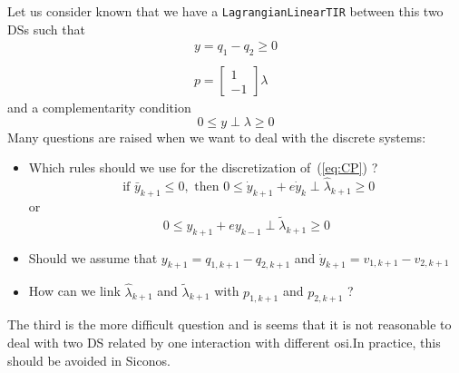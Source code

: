 Let us consider known that we have a {\tt LagrangianLinearTIR} between this two DSs such that
\begin{equation}
  \label{eq:LTIR-2DS}
  \begin{array}{l}
  y = q_1-q_2 \geq 0 \\ \\
  p = \left[
  \begin{array}{c}
    1 \\
    -1
  \end{array}\right] \lambda
\end{array}
\end{equation}
and a complementarity condition
\begin{equation}
  \label{eq:CP}
  0\leq y \perp \lambda \geq 0
\end{equation}
Many questions are raised when we want to deal with the discrete systems:
\begin{itemize}
\item Which rules should we use for the discretization of~(\ref{eq:CP}) ?
  \begin{equation}
    \label{eq:CP-TS1}
    \text{ if } \bar y_{k+1}\leq 0, \text{ then }  0\leq \dot y _{k+1} + e \dot y_{k} \perp \hat \lambda_{k+1}\geq 0 
  \end{equation}
  or
  \begin{equation}
    \label{eq:CP-TS2}
    0\leq y _{k+1} + e y_{k-1} \perp \tilde \lambda_{k+1}\geq 0 
  \end{equation}
\item Should we assume that $y_{k+1} = q_{1,k+1}-q_{2,k+1}$ and $\dot y_{k+1} = v_{1,k+1}-v_{2,k+1}$
\item How can we link $\hat \lambda_{k+1}$ and  $\tilde \lambda_{k+1}$ with $p_{1,k+1}$ and $p_{2,k+1}$ ?
\end{itemize}

The third is the more difficult question and is seems that it is not reasonable to deal with two DS related by one interaction with different osi.In practice, this should be avoided in Siconos.




